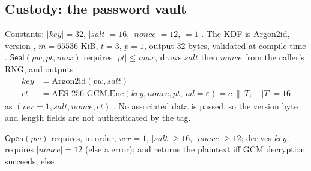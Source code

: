 \subsection{Custody: the password vault}
\label{subsec:app-vault}

\begin{definition}[Seal]
\label{def:app-seal}
Constants: $|\mathit{key}|=32$, $|\mathit{salt}|=16$, $|\mathit{nonce}|=12$,
$=1$ . The KDF is
Argon2id, version , $m=65536$ KiB, $t=3$, $p=1$, output 32 bytes,
validated at compile time .
$\mathsf{Seal}(\mathit{pw}, \mathit{pt}, \mathit{max})$ requires
$|\mathit{pt}|\le\mathit{max}$, draws $\mathit{salt}$ then $\mathit{nonce}$
from the caller's RNG, and outputs
\begin{align}
  \mathit{key} &= \mathrm{Argon2id}(\mathit{pw}, \mathit{salt}) \\
  \mathit{ct} &= \mathrm{AES\text{-}256\text{-}GCM}.\mathrm{Enc}(\mathit{key}, \mathit{nonce}, \mathit{pt};\ \mathit{ad}=\varepsilon) = c\ \|\ T,\quad |T|=16
\end{align}
as $(\mathit{ver}=1, \mathit{salt}, \mathit{nonce}, \mathit{ct})$
. No associated data is passed, so the
version byte and length fields are not authenticated by the tag.
\end{definition}

\begin{definition}[Open]
\label{def:app-open}
$\mathsf{Open}(\mathit{pw})$ requires, in order, $\mathit{ver}=1$,
$|\mathit{salt}|\ge 16$, $|\mathit{nonce}|\ge 12$; derives $\mathit{key}$;
requires $|\mathit{nonce}|=12$ (else a  error); and returns the
plaintext iff GCM decryption succeeds, else 
.
\end{definition}

